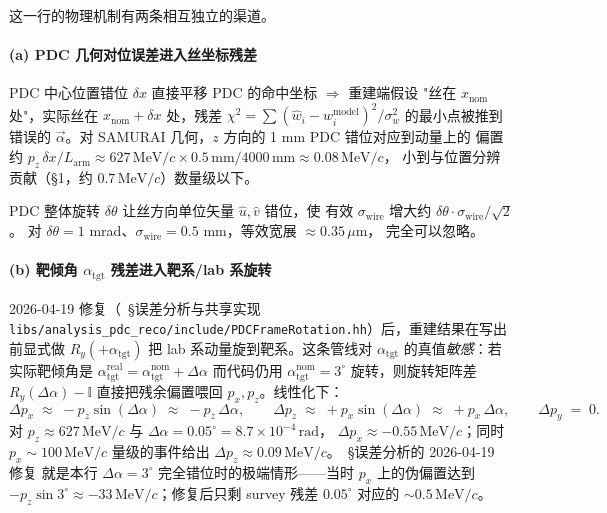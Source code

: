 这一行的物理机制有两条相互独立的渠道。

\paragraph{(a) PDC 几何对位误差进入丝坐标残差}
PDC 中心位置错位 $\delta x$ 直接平移 PDC 的命中坐标 $\Rightarrow$ 重建端假设
"丝在 $x_\mathrm{nom}$ 处"，实际丝在 $x_\mathrm{nom}+\delta x$ 处，残差
$\chi^2 = \sum (\hat w_i - w_i^\mathrm{model})^2/\sigma_w^2$ 的最小点被推到
错误的 $\vec\alpha$。对 SAMURAI 几何，$z$ 方向的 1 mm PDC 错位对应到动量上的
偏置约 $p_z\,\delta x / L_\mathrm{arm} \approx 627\,\mathrm{MeV}/c \times
0.5\,\mathrm{mm} / 4000\,\mathrm{mm} \approx 0.08\,\mathrm{MeV}/c$，
小到与位置分辨贡献（§1，约 $0.7\,\mathrm{MeV}/c$）数量级以下。

PDC 整体旋转 $\delta\theta$ 让丝方向单位矢量 $\hat u, \hat v$ 错位，使
有效 $\sigma_\mathrm{wire}$ 增大约 $\delta\theta\cdot\sigma_\mathrm{wire}/\sqrt 2$。
对 $\delta\theta=1$ mrad、$\sigma_\mathrm{wire}=0.5$ mm，等效宽展 $\approx 0.35\,\mu$m，
完全可以忽略。

\paragraph{(b) 靶倾角 $\alpha_\mathrm{tgt}$ 残差进入靶系/lab 系旋转}
2026-04-19 修复（\StatusReport{}~§误差分析与共享实现 \texttt{libs/analysis\_pdc\_reco/include/PDCFrameRotation.hh}）后，重建结果在写出前显式做 $R_y(+\alpha_\mathrm{tgt})$ 把 lab 系动量旋到靶系。这条管线对 $\alpha_\mathrm{tgt}$ 的真值\emph{敏感}：若实际靶倾角是 $\alpha_\mathrm{tgt}^\mathrm{real} = \alpha_\mathrm{tgt}^\mathrm{nom} + \Delta\alpha$ 而代码仍用 $\alpha_\mathrm{tgt}^\mathrm{nom}=3^\circ$ 旋转，则旋转矩阵差 $R_y(\Delta\alpha) - \mathbb I$ 直接把残余偏置喂回 $p_x, p_z$。线性化下：
\begin{equation}
  \Delta p_x \;\approx\; -p_z\sin(\Delta\alpha) \;\approx\; -p_z\,\Delta\alpha,\qquad
  \Delta p_z \;\approx\; +p_x\sin(\Delta\alpha) \;\approx\; +p_x\,\Delta\alpha,\qquad
  \Delta p_y \;=\; 0.
  \label{eq:partIIc:tilt:rotation-bias}
\end{equation}
对 $p_z\approx 627\,\mathrm{MeV}/c$ 与 $\Delta\alpha = 0.05^\circ = 8.7\times 10^{-4}\,\mathrm{rad}$，
$\Delta p_x \approx -0.55\,\mathrm{MeV}/c$；同时 $p_x\sim 100\,\mathrm{MeV}/c$ 量级的事件给出
$\Delta p_z \approx 0.09\,\mathrm{MeV}/c$。\StatusReport{}~§误差分析的 2026-04-19 修复
就是本行 $\Delta\alpha=3^\circ$ 完全错位时的极端情形——当时 $p_x$ 上的伪偏置达到
$-p_z\sin 3^\circ\approx -33\,\mathrm{MeV}/c$；修复后只剩 survey 残差 $0.05^\circ$
对应的 $\sim 0.5\,\mathrm{MeV}/c$。


